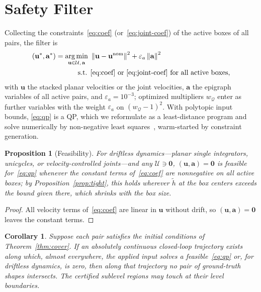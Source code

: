 \documentclass[journal]{IEEEtran}
\newtheorem{proposition}{Proposition}
\newtheorem{corollary}{Corollary}
\theoremstyle{definition}
\newcommand{\norm}[1]{\left\lVert #1\right\rVert}
\DeclareMathOperator*{\argmin}{arg\,min}
\begin{document}
\section{Safety Filter}\label{sec:filter}
Collecting the constraints~\eqref{eq:coef} (or~\eqref{eq:joint-coef}) of the active boxes of all pairs, the filter is
\begin{equation}\label{eq:qp}
\begin{aligned}
(\mathbf u^\ast,\mathbf a^\ast)=\argmin_{\mathbf u\in\mathcal U,\,\mathbf a}\ &\norm{\mathbf u-\mathbf u^{\rm nom}}^2+\varepsilon_a\norm{\mathbf a}^2\\
\text{s.t. }&\eqref{eq:coef}\ \text{or}\ \eqref{eq:joint-coef}\ \text{for all active boxes},
\end{aligned}
\end{equation}
with $\mathbf u$ the stacked planar velocities or the joint velocities, $\mathbf a$ the epigraph
variables of all active pairs, and $\varepsilon_a=10^{-3}$; optimized multipliers $w_{\mathcal Q}$
enter as further variables with the weight $\varepsilon_a$ on $(w_{\mathcal Q}-1)^2$. With
polytopic input bounds, \eqref{eq:qp} is a QP, which we reformulate as a least-distance program and solve numerically by
non-negative least squares~\cite{lawson1995solving}, warm-started by constraint generation.
\begin{proposition}[Feasibility]\label{prop:feas}
For driftless dynamics---planar single integrators, unicycles, or velocity-controlled joints---and
any $\mathcal U\ni\mathbf 0$, $(\mathbf u,\mathbf a)=\mathbf 0$ is feasible for~\eqref{eq:qp} whenever
the constant terms of~\eqref{eq:coef} are nonnegative on all active boxes; by
Proposition~\ref{prop:tight}, this holds wherever $\tilde h$ at the box centers exceeds the bound given
there, which shrinks with the box size.
\end{proposition}
\begin{proof}
All velocity terms of~\eqref{eq:coef} are linear in $\mathbf u$ without drift, so
$(\mathbf u,\mathbf a)=\mathbf 0$ leaves the constant terms.
\end{proof}
\begin{corollary}\label{cor:closed}
Suppose each pair satisfies the initial conditions of Theorem~\ref{thm:cover}. If an absolutely
continuous closed-loop trajectory exists along which, almost everywhere, the applied input solves a
feasible~\eqref{eq:qp} or, for driftless dynamics, is zero, then along that trajectory
no pair of ground-truth shapes intersects. The certified sublevel regions may touch at their
level boundaries.
\end{corollary}
\end{document}

